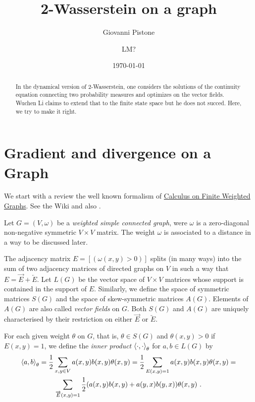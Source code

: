 \documentclass[12pt,a4paper]{amsart}
\title{2-Wasserstein on a graph}
\author{Giovanni Pistone}
\author{LM?}
\date{\today}
\theoremstyle{definition}
\begin{document}
\maketitle

\begin{abstract}
  In the dynamical version of 2-Wasserstein, one considers the
  solutions of the continuity equation connecting two probability
  measures and optimizes on the vector fields. Wuchen Li claims to
  extend that to the finite state space but he does not succed. Here,
  we try to make it right.
\end{abstract}
\section{Gradient and divergence on a Graph}

We start with a review the well known formalism of
\href{https://en.wikipedia.org/wiki/Calculus_on_finite_weighted_graphs}
{Calculus on Finite Weighted Graphs}. See the Wiki and also
\citep{bollobas:1998}.

Let $G = (V,\omega)$ be a \emph{weighted simple connected graph}, were
$\omega$ is a zero-diagonal non-negative symmetric $V \times V$
matrix. The weight $\omega$ is associated to a distance in a way to be
discussed later.

The adjacency matrix $E = [(\omega(x,y) > 0)]$ splits (in many
ways) into the sum of two adjacency matrices of directed graphs on $V$
in such a way that $E = \overrightarrow E + \overleftarrow E$. Let
$L(G)$ be the vector space of $V \times V$ matrices whose support is
contained in the support of $E$. Similarly, we define the space of
symmetric matrices $S(G)$ and the space of skew-symmetric matrices
$A(G)$. Elements of $A(G)$ are also called \emph{vector fields} on
$G$. Both $S(G)$ and $A(G)$ are uniquely characterised by their
restriction on either $\overrightarrow E$ or $\overleftarrow E$.

For each given weight $\theta$ on $G$, that is, $\theta \in S(G)$ and
$\theta(x,y) > 0$ if $E(x,y)=1$, we define the \emph{inner product}
$\left\langle\cdot,\cdot\right\rangle_{\theta}$ for $a,b \in L(G)$ by
\begin{multline*}
  \left\langle a,b\right\rangle_{\theta} = \frac 12 \sum _ {x,y \in V} a(x,y)
  b(x,y)\theta(x,y) = \frac 12 \sum _ {E(x,y)=1} a(x,y)
  b(x,y)\theta(x,y) = \\ \sum_{\overrightarrow E(x,y)=1}
  \frac12(a(x,y)b(x,y)+a(y,x)b(y,x)) \theta(x,y)\ .
\end{multline*}
\end{document}

